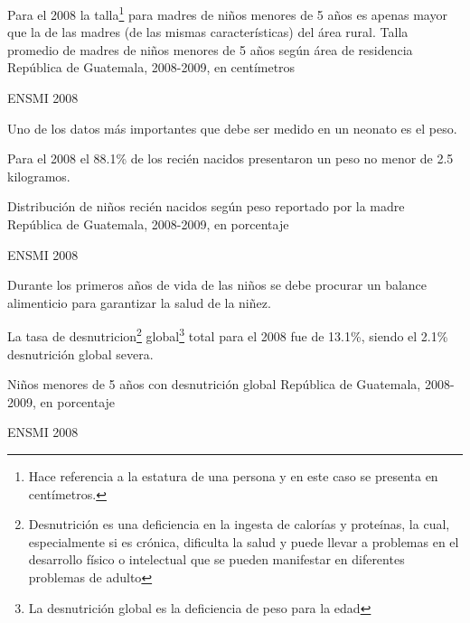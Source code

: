 
%
{%
	Para el 2008 la talla\footnote{Hace referencia a la estatura de una persona y en este caso se presenta en centímetros.} para madres de niños menores de 5 años es apenas mayor que la de las madres (de las mismas características) del área rural. 
}%
{%
	Talla promedio de madres  de niños menores de 5 años según área de residencia} %
{%
	República de Guatemala, 2008-2009, en centímetros} %
{%
	\begin{tikzpicture}[x=1pt,y=1pt]    \end{tikzpicture}}%
{%
	ENSMI 2008} %


%
{%
	Uno de los datos más importantes que debe ser medido en un neonato es el peso. 
	
	Para el 2008 el 88.1\% de los recién nacidos presentaron un peso no menor de  2.5 kilogramos. 
}%
{%
	Distribución de niños recién nacidos según peso reportado por la madre} %
{%
	República de Guatemala, 2008-2009, en porcentaje} %
{%
	\begin{tikzpicture}[x=1pt,y=1pt]    \end{tikzpicture}}%
{%
	ENSMI 2008} %


%
{%
	Durante los primeros años de vida de las niños se debe procurar un balance alimenticio para garantizar la salud de la niñez. 
	
	La tasa de desnutricion\footnote{Desnutrición es una deficiencia en la ingesta de calorías y proteínas, la cual, especialmente si es crónica, dificulta la salud y puede llevar a problemas en el desarrollo físico o intelectual que se pueden manifestar en diferentes problemas de adulto} global\footnote{La desnutrición global es  la deficiencia de peso para la edad} total para el 2008 fue de 13.1\%, siendo el 2.1\% desnutrición global severa. 
	
	
}%
{%
	Niños menores de 5 años con desnutrición global} %
{%
	República de Guatemala, 2008-2009, en porcentaje} %
{%
	\begin{tikzpicture}[x=1pt,y=1pt]    \end{tikzpicture}}%
{%
	ENSMI 2008} %


